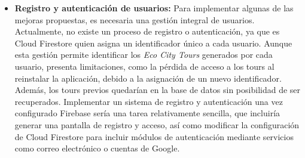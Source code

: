 \begin{itemize}
	\item \textbf{Registro y autenticación de usuarios:} Para implementar algunas de las mejoras propuestas, es necesaria una gestión integral de usuarios. Actualmente, no existe un proceso de registro o autenticación, ya que es Cloud Firestore quien asigna un identificador único a cada usuario. Aunque esta gestión permite identificar los \textit{Eco City Tours} generados por cada usuario, presenta limitaciones, como la pérdida de acceso a los tours al reinstalar la aplicación, debido a la asignación de un nuevo identificador. Además, los tours previos quedarían en la base de datos sin posibilidad de ser recuperados. Implementar un sistema de registro y autenticación una vez configurado Firebase sería una tarea relativamente sencilla, que incluiría generar una pantalla de registro y acceso, así como modificar la configuración de Cloud Firestore para incluir módulos de autenticación mediante servicios como correo electrónico o cuentas de Google.
\end{itemize}